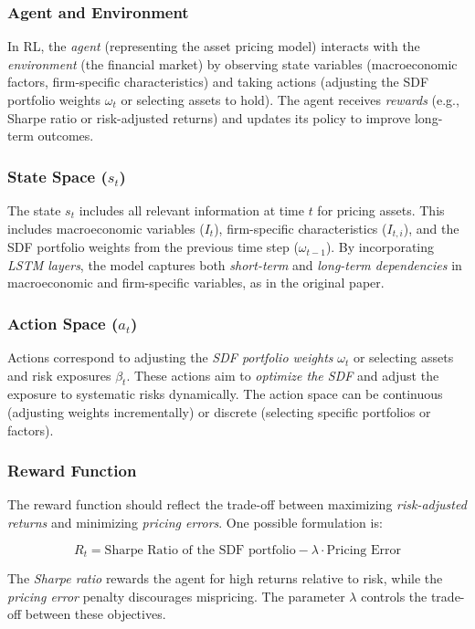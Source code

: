 \subsubsection{Agent and Environment}
In RL, the \textit{agent} (representing the asset pricing model) interacts with the \textit{environment} (the financial market) by observing state variables (macroeconomic factors, firm-specific characteristics) and taking actions (adjusting the SDF portfolio weights $\omega_t$ or selecting assets to hold). The agent receives \textit{rewards} (e.g., Sharpe ratio or risk-adjusted returns) and updates its policy to improve long-term outcomes.

\subsubsection{State Space ($s_t$)}
The state $s_t$ includes all relevant information at time $t$ for pricing assets. This includes macroeconomic variables ($I_t$), firm-specific characteristics ($I_{t, i}$), and the SDF portfolio weights from the previous time step ($\omega_{t-1}$). By incorporating \textit{LSTM layers}, the model captures both \textit{short-term} and \textit{long-term dependencies} in macroeconomic and firm-specific variables, as in the original paper.

\subsubsection{Action Space ($a_t$)}
Actions correspond to adjusting the \textit{SDF portfolio weights} $\omega_t$ or selecting assets and risk exposures $\beta_t$. These actions aim to \textit{optimize the SDF} and adjust the exposure to systematic risks dynamically. The action space can be continuous (adjusting weights incrementally) or discrete (selecting specific portfolios or factors).

\subsubsection{Reward Function}
The reward function should reflect the trade-off between maximizing \textit{risk-adjusted returns} and minimizing \textit{pricing errors}. One possible formulation is:

\[
R_t = \text{Sharpe Ratio of the SDF portfolio} - \lambda \cdot \text{Pricing Error}
\]

The \textit{Sharpe ratio} rewards the agent for high returns relative to risk, while the \textit{pricing error} penalty discourages mispricing. The parameter $\lambda$ controls the trade-off between these objectives.

